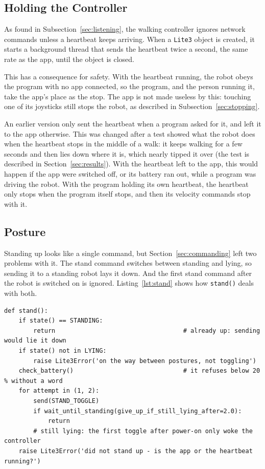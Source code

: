 \subsection{Holding the Controller}
\label{sec:heartbeat}

As found in Subsection~\ref{sec:listening}, the walking controller ignores network commands unless a
heartbeat keeps arriving. When a \texttt{Lite3} object is created, it starts a background thread that sends
the heartbeat twice a second, the same rate as the app, until the object is closed.

This has a consequence for safety. With the heartbeat running, the robot obeys the program with no app
connected, so the program, and the person running it, take the app's place as the stop. The app is not
made useless by this: touching one of its joysticks still stops the robot, as described in
Subsection~\ref{sec:stopping}.

An earlier version only sent the heartbeat when a program asked for it, and left it to the app otherwise.
This was changed after a test showed what the robot does when the heartbeat stops in the middle of a walk:
it keeps walking for a few seconds and then lies down where it is, which nearly tipped it over (the test is
described in Section~\ref{sec:results}). With the heartbeat left to the app, this would happen if the app
were switched off, or its battery ran out, while a program was driving the robot. With the program holding
its own heartbeat, the heartbeat only stops when the program itself stops, and then its velocity commands
stop with it.

\subsection{Posture}
\label{sec:posture}

Standing up looks like a single command, but Section~\ref{sec:commanding} left two problems with it. The
stand command switches between standing and lying, so sending it to a standing robot lays it down. And the
first stand command after the robot is switched on is ignored. Listing~\ref{lst:stand} shows how
\texttt{stand()} deals with both.

\begin{lstlisting}[float=htbp, captionpos=b, label=lst:stand,
  caption={How \texttt{stand()} works, simplified. The robot is only toggled from a settled lying state, and the toggle is sent once more if it was swallowed.}]
def stand():
    if state() == STANDING:
        return                                   # already up: sending would lie it down
    if state() not in LYING:
        raise Lite3Error('on the way between postures, not toggling')
    check_battery()                              # it refuses below 20 % without a word
    for attempt in (1, 2):
        send(STAND_TOGGLE)
        if wait_until_standing(give_up_if_still_lying_after=2.0):
            return
        # still lying: the first toggle after power-on only woke the controller
    raise Lite3Error('did not stand up - is the app or the heartbeat running?')
\end{lstlisting}

